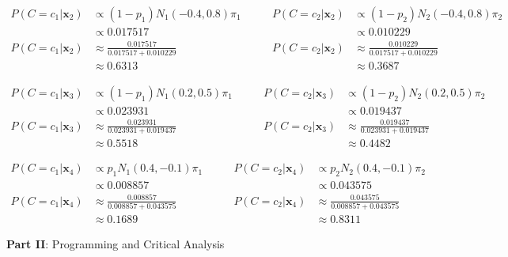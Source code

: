 \documentclass[12pt]{article}
\begin{document}
\begin{enumerate}[leftmargin=\labelsep]
    \begin{equation}
    \begin{aligned}
        P(C=c_1|\mathbf{x}_2) &\propto (1-p_1)N_1(-0.4, 0.8)\pi_1 &\qquad P(C=c_2|\mathbf{x}_2) &\propto (1-p_2)N_2(-0.4, 0.8)\pi_2 \\
        &\propto 0.017517 &\qquad &\propto 0.010229 \\
        P(C=c_1|\mathbf{x}_2) &\approx \frac{0.017517}{0.017517+0.010229} &\qquad P(C=c_2|\mathbf{x}_2) &\approx \frac{0.010229}{0.017517+0.010229} \\
        &\approx 0.6313 &\qquad &\approx 0.3687
    \end{aligned}
    \end{equation}

    \begin{equation}
    \begin{aligned}
        P(C=c_1|\mathbf{x}_3) &\propto (1-p_1)N_1(0.2, 0.5)\pi_1 &\qquad P(C=c_2|\mathbf{x}_3) &\propto (1-p_2)N_2(0.2, 0.5)\pi_2 \\
        &\propto 0.023931 &\qquad &\propto 0.019437 \\
        P(C=c_1|\mathbf{x}_3) &\approx \frac{0.023931}{0.023931+0.019437} &\qquad P(C=c_2|\mathbf{x}_3) &\approx \frac{0.019437}{0.023931+0.019437} \\
        &\approx 0.5518 &\qquad &\approx 0.4482
    \end{aligned}
    \end{equation}

    \begin{equation}
    \begin{aligned}
        P(C=c_1|\mathbf{x}_4) &\propto p_1N_1(0.4, -0.1)\pi_1 &\qquad P(C=c_2|\mathbf{x}_4) &\propto p_2N_2(0.4, -0.1)\pi_2 \\
        &\propto 0.008857 &\qquad &\propto 0.043575 \\
        P(C=c_1|\mathbf{x}_4) &\approx \frac{0.008857}{0.008857+0.043575} &\qquad P(C=c_2|\mathbf{x}_4) &\approx \frac{0.043575}{0.008857+0.043575} \\
        &\approx 0.1689 &\qquad &\approx 0.8311
    \end{aligned}
    \end{equation}
\end{enumerate}

\vskip 10cm

\large{\textbf{Part II}: Programming and Critical Analysis}\normalsize
\end{document}
